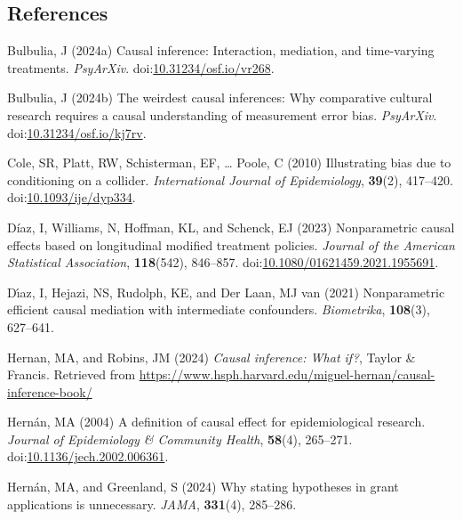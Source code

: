 \documentclass[
  single column]{article}
\newlength{\cslhangindent}
\newenvironment{CSLReferences}[2] %
 {\begin{list}{}{%
  \setlength{\itemindent}{0pt}
  \setlength{\leftmargin}{0pt}
  \setlength{\parsep}{0pt}
  \ifodd #1
   \setlength{\leftmargin}{\cslhangindent}
   \setlength{\itemindent}{-1\cslhangindent}
  \fi
  \setlength{\itemsep}{#2\baselineskip}}}
 {\end{list}}
\begin{document}
\newpage{}

\subsection{References}\label{references}

\label{refs}
\begin{CSLReferences}{1}{0}
Bulbulia, J (2024a) Causal inference: Interaction, mediation, and
time-varying treatments. \emph{PsyArXiv}.
doi:\href{https://doi.org/10.31234/osf.io/vr268}{10.31234/osf.io/vr268}.

Bulbulia, J (2024b) The weirdest causal inferences: Why comparative
cultural research requires a causal understanding of measurement error
bias. \emph{PsyArXiv}.
doi:\href{https://doi.org/10.31234/osf.io/kj7rv}{10.31234/osf.io/kj7rv}.

Cole, SR, Platt, RW, Schisterman, EF, \ldots{} Poole, C (2010)
Illustrating bias due to conditioning on a collider. \emph{International
Journal of Epidemiology}, \textbf{39}(2), 417--420.
doi:\href{https://doi.org/10.1093/ije/dyp334}{10.1093/ije/dyp334}.

Díaz, I, Williams, N, Hoffman, KL, and Schenck, EJ (2023) Nonparametric
causal effects based on longitudinal modified treatment policies.
\emph{Journal of the American Statistical Association},
\textbf{118}(542), 846--857.
doi:\href{https://doi.org/10.1080/01621459.2021.1955691}{10.1080/01621459.2021.1955691}.

Dı́az, I, Hejazi, NS, Rudolph, KE, and Der Laan, MJ van (2021)
Nonparametric efficient causal mediation with intermediate confounders.
\emph{Biometrika}, \textbf{108}(3), 627--641.

Hernan, MA, and Robins, JM (2024) \emph{Causal inference: What if?},
Taylor \& Francis. Retrieved from
\url{https://www.hsph.harvard.edu/miguel-hernan/causal-inference-book/}

Hernán, MA (2004) A definition of causal effect for epidemiological
research. \emph{Journal of Epidemiology \& Community Health},
\textbf{58}(4), 265--271.
doi:\href{https://doi.org/10.1136/jech.2002.006361}{10.1136/jech.2002.006361}.

Hernán, MA, and Greenland, S (2024) Why stating hypotheses in grant
applications is unnecessary. \emph{JAMA}, \textbf{331}(4), 285--286.


\end{CSLReferences}
\end{document}

